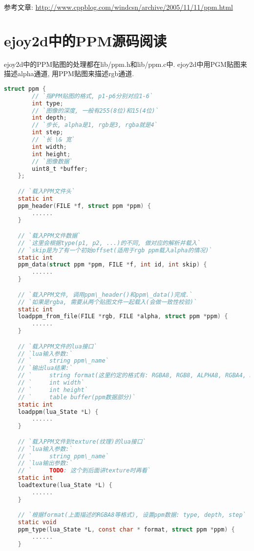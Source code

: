 {    \par{参考文章: \href{http://www.cppblog.com/windcsn/archive/2005/11/11/ppm.html}{http://www.cppblog.com/windcsn/archive/2005/11/11/ppm.html}}
}

\section{\ZHH ejoy2d中的PPM源码阅读}{
    {ejoy2d中的PPM贴图的处理都在lib/ppm.h和lib/ppm.c中. ejoy2d中用PGM贴图来描述alpha通道, 用PPM贴图来描述rgb通道. }\par
    \begin{lstlisting}[language=C]
    struct ppm {
        // `指PPM贴图的格式, p1-p6分别对应1-6`
        int type;
        // `图像的深度, 一般有255(8位)和15(4位)`
        int depth;
        // `步长, alpha是1, rgb是3, rgba就是4`
        int step;
        // `长 \& 宽`
        int width;
        int height;
        // `图像数据`
        uint8_t *buffer;
    };

    // `载入PPM文件头`
    static int
    ppm_header(FILE *f, struct ppm *ppm) {
        ......
    }

    // `载入PPM文件数据`
    // `这里会根据type(p1, p2, ...)的不同, 做对应的解析并载入`
    // `skip是为了有一个初始offset(适用于rgb ppm载入alpha的情况)`
    static int
    ppm_data(struct ppm *ppm, FILE *f, int id, int skip) {
        ......
    }

    // `载入PPM文件, 调用ppm\_header()和ppm\_data()完成.`
    // `如果是rgba, 需要从两个贴图文件一起载入(会做一致性校验)`
    static int
    loadppm_from_file(FILE *rgb, FILE *alpha, struct ppm *ppm) {
        ......
    }

    // `载入PPM文件的lua接口`
    // `lua输入参数:`
    // `     string ppm\_name`
    // `输出lua结果:`
    // `     string format(这里约定的格式有: RGBA8, RGB8, ALPHA8, RGBA4, RGB4, ALPHA4)`
    // `     int width`
    // `     int height`
    // `     table buffer(ppm数据部分)`
    static int
    loadppm(lua_State *L) {
        ......
    }

    // `载入PPM文件到texture(纹理)的lua接口`
    // `lua输入参数:`
    // `     string ppm\_name`
    // `lua输出参数:`
    // `     TODO: 这个到后面讲texture时再看`
    static int
    loadtexture(lua_State *L) {
        ......
    }

    // `根据format(上面描述的RGBA8等格式), 设置ppm数据: type, depth, step`
    static void
    ppm_type(lua_State *L, const char * format, struct ppm *ppm) {
        ......
    }


\end{lstlisting}}
